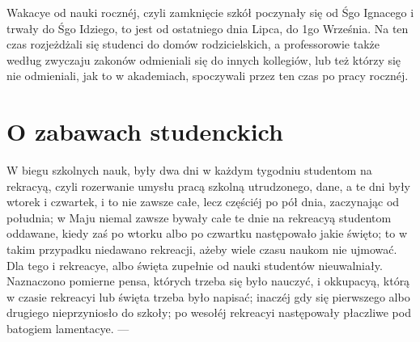 \documentclass{book}
\begin{document}
Wakacye od nauki rocznéj, czyli zamknięcie szkół poczynały się od Śgo Ignacego i trwały do Śgo Idziego, to jest od ostatniego dnia Lipca, do 1go Września. Na ten czas rozjeżdżali się studenci do domów rodzicielskich, a professorowie także według zwyczaju zakonów odmieniali się do innych kollegiów, lub też którzy się nie odmieniali, jak to w akademiach, spoczywali przez ten czas po pracy rocznéj.

\section{O zabawach studenckich}

W biegu szkolnych nauk, były dwa dni w każdym tygodniu studentom na rekracyą, czyli rozerwanie umysłu pracą szkolną utrudzonego, dane, a te dni były wtorek i czwartek, i to nie zawsze całe, lecz częściéj po pół dnia, zaczynając od południa; w Maju niemal zawsze bywały całe te dnie na rekreacyą studentom oddawane, kiedy zaś po wtorku albo po czwartku następowało jakie święto; to w takim przypadku niedawano rekreacji, ażeby wiele czasu naukom nie ujmować. Dla tego i rekreacye, albo święta zupełnie od nauki studentów nieuwalniały. Naznaczono pomierne pensa, których trzeba się było nauczyć, i okkupacyą, którą w czasie rekreacyi lub święta trzeba było napisać; inaczéj gdy się pierwszego albo drugiego nieprzyniosło do szkoły; po wesołéj rekreacyi następowały płaczliwe pod batogiem lamentacye. —
\end{document}
